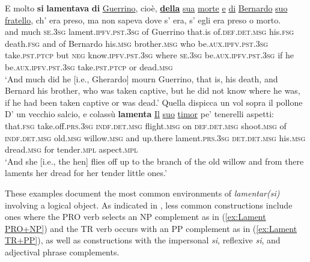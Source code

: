 \documentclass[output=paper,colorlinks,citecolor=brown]{langscibook}
\begin{document}
\largerpage
\begin{exe}
\ex \label{Lamentarsi Set1} \begin{xlist}
    \ex \label{ex:Lament Oblique}
    \gll E molto \textbf{si} \textbf{lamentava} \textbf{di} \ul{Guerrino}, cioè, \ul{\textbf{della}} \ul{sua} 	\ul{morte} \ul{e} \ul{di} \ul{Bernardo} \ul{suo} \ul{fratello}, ch' era preso, ma	non	sapeva dove s' era, s' egli era	preso o morto.\\
    and much \textsc{se}.\textsc{3sg} lament.\textsc{ipfv.pst.3sg} of Guerrino that.is of.\textsc{def.det.msg} his.\textsc{fsg} death.\textsc{fsg} and of Bernardo his.\textsc{msg} brother.\textsc{msg} who be.\textsc{aux.ipfv.pst.3sg} take.\textsc{pst.ptcp} but \textsc{neg} know.\textsc{ipfv.pst.3sg} where \textsc{se}.\textsc{3sg} be.\textsc{aux.ipfv.pst.3sg} if he be.\textsc{aux.ipfv.pst.3sg} take.\textsc{pst.ptcp} or dead.\textsc{msg}\\ 
    \clearpage
    \glt ‘And much did he [i.e., Gherardo] mourn Guerrino, that is, his death, and Bernard his brother, who was taken captive, but he did not know where he was, if he had been taken captive or was dead.’
    \ex\label{ex:Lament Direct}
    \gll Quella dispicca un vol sopra il pollone D' un vecchio salcio, e colassù \textbf{lamenta} \ul{Il} \ul{suo} \ul{timor} pe’ tenerelli aspetti:\\
    that.\textsc{fsg} take.off.\textsc{prs.3sg} \textsc{indf.det.msg} flight.\textsc{msg} on \textsc{def.det.msg} shoot.\textsc{msg} of \textsc{indf.det.msg} old.\textsc{msg} willow.\textsc{msg} and up.there lament.\textsc{prs.3sg} \textsc{det.det.msg} his.\textsc{msg} dread.\textsc{msg} for tender.\textsc{mpl} aspect.\textsc{mpl}\\  
    \glt ‘And she [i.e., the hen] flies off up to the branch of the old willow and from there laments her dread for her tender little ones.’
\end{xlist}
\end{exe}

These examples document the most common environments of \textit{lamentar(si)} involving a logical object. As indicated in , less common constructions include ones where the PRO verb selects an NP complement as in (\ref{ex:Lament PRO+NP}) and the TR verb occurs with an PP complement as in (\ref{ex:Lament TR+PP}), as well as constructions with the impersonal \textit{si}, reflexive \textit{si}, and adjectival phrase complements.
\end{document}
